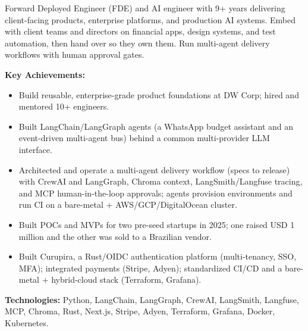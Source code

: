 \documentclass[10pt,a4paper]{altacv}
\begin{document}

%

\begin{fullwidth}
\makecvheader
\end{fullwidth}

%


Forward Deployed Engineer (FDE) and AI engineer with 9+ years delivering client-facing products, enterprise platforms, and production AI systems. Embed with client teams and directors on financial apps, design systems, and test automation, then hand over so they own them. Run multi-agent delivery workflows with human approval gates.



\textbf{Key Achievements:}
\begin{itemize}
\setlength{\itemindent}{0.5em}
\item[--] Build reusable, enterprise-grade product foundations at DW Corp; hired and mentored 10+ engineers.
\item[--] Built LangChain/LangGraph agents (a WhatsApp budget assistant and an event-driven multi-agent bus) behind a common multi-provider LLM interface.
\item[--] Architected and operate a multi-agent delivery workflow (specs to release) with CrewAI and LangGraph, Chroma context, LangSmith/Langfuse tracing, and MCP human-in-the-loop approvals; agents provision environments and run CI on a bare-metal + AWS/GCP/DigitalOcean cluster.
\item[--] Built POCs and MVPs for two pre-seed startups in 2025; one raised USD 1 million and the other was sold to a Brazilian vendor.
\item[--] Built Curupira, a Rust/OIDC authentication platform (multi-tenancy, SSO, MFA); integrated payments (Stripe, Adyen); standardized CI/CD and a bare-metal + hybrid-cloud stack (Terraform, Grafana).
\end{itemize}
\textbf{Technologies:} Python, LangChain, LangGraph, CrewAI, LangSmith, Langfuse, MCP, Chroma, Rust, Next.js, Stripe, Adyen, Terraform, Grafana, Docker, Kubernetes.
\vspace{2mm}
\end{document}
